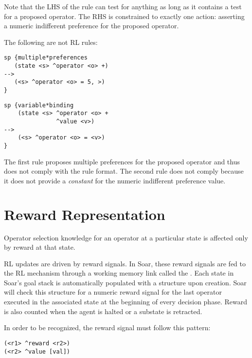 Note that the LHS of the rule can test for anything as long as it contains a test for a proposed operator.
The RHS is constrained to exactly one action: asserting a numeric indifferent preference for the proposed operator.

The following are not RL rules:

\begin{verbatim}
sp {multiple*preferences
   (state <s> ^operator <o> +)
-->
   (<s> ^operator <o> = 5, >)
}
\end{verbatim}  \vspace{12pt}

\begin{verbatim}
sp {variable*binding
    (state <s> ^operator <o> +
               ^value <v>)
-->
    (<s> ^operator <o> = <v>)
}
\end{verbatim}  \vspace{12pt}

The first rule proposes multiple preferences for the proposed operator and thus does not comply with the rule format.
The second rule does not comply because it does not provide a \emph{constant} for the numeric indifferent preference value.

\section{Reward Representation}
\label{RL-reward}

Operator selection knowledge for an operator at a particular state is affected only by reward at that state.

RL updates are driven by reward signals.
In Soar, these reward signals are fed to the RL mechanism through a working memory link called the .
Each state in Soar's goal stack is automatically populated with a  structure upon creation.
Soar will check this structure for a numeric reward signal for the last operator executed in the associated state at the beginning of every decision phase.
Reward is also counted when the agent is halted or a substate is retracted.

In order to be recognized, the reward signal must follow this pattern:

\begin{verbatim}
(<r1> ^reward <r2>)
(<r2> ^value [val])
\end{verbatim}

